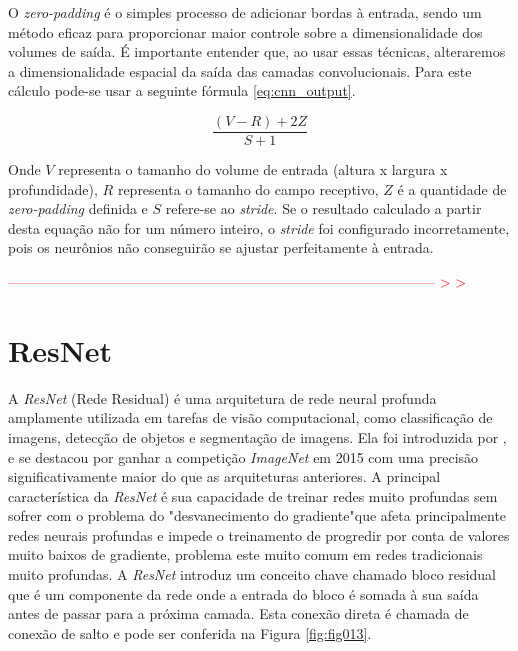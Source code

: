 O \textit{zero-padding} é o simples processo de adicionar bordas à entrada, sendo um método eficaz para proporcionar maior controle sobre a dimensionalidade dos volumes de saída. É importante entender que, ao usar essas técnicas, alteraremos a dimensionalidade espacial da saída das camadas convolucionais. Para este cálculo pode-se usar a seguinte fórmula \ref{eq:cnn_output}.

\begin{equation}
\frac{(V - R) + 2Z}{S + 1}
\label{eq:cnn_output}
\end{equation}

Onde $V$ representa o tamanho do volume de entrada (altura x largura x profundidade), $R$ representa o tamanho do campo receptivo, $Z$ é a quantidade de \textit{zero-padding} definida e $S$ refere-se ao \textit{stride}. Se o resultado calculado a partir desta equação não for um número inteiro, o \textit{stride} foi configurado incorretamente, pois os neurônios não conseguirão se ajustar perfeitamente à entrada.

\textcolor{red}{
-------------------------------------------------------------------------------------------- > >
}

\section{ResNet}
\label{sec:resnet}

A \textit{ResNet} (Rede Residual) é uma arquitetura de rede neural profunda amplamente utilizada em tarefas de visão computacional, como classificação de imagens, detecção de objetos e segmentação de imagens. Ela foi introduzida por , e se destacou por ganhar a competição \textit{ImageNet} em 2015 com uma precisão significativamente maior do que as arquiteturas anteriores. A principal característica da \textit{ResNet} é sua capacidade de treinar redes muito profundas sem sofrer com o problema do "desvanecimento do gradiente"\space que afeta principalmente redes neurais profundas e impede o treinamento de progredir por conta de valores muito baixos de gradiente, problema este muito comum em redes tradicionais muito profundas. A \textit{ResNet} introduz um conceito chave chamado bloco residual que é um componente da rede onde a entrada do bloco é somada à sua saída antes de passar para a próxima camada. Esta conexão direta é chamada de conexão de salto e pode ser conferida na Figura \ref{fig:fig013}.

